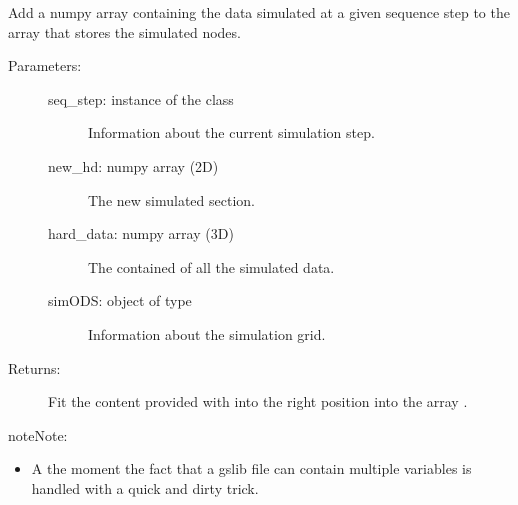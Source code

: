 \documentclass[letterpaper,10pt,english]{sphinxmanual}
\begin{document}
\begin{fulllineitems}
\label{\detokenize{appendices:s2Dcd.s2Dcd.add_hd}}
Add a numpy array containing the data simulated at a given
sequence step to the array that stores the simulated nodes.
\begin{description}
\item[{Parameters:}] \leavevmode\begin{description}
\item[{seq\_step: instance of the class {\hyperref[\detokenize{appendices:s2Dcd.s2Dcd.SeqStep}]{}}}] \leavevmode
Information about the current simulation step.

\item[{new\_hd: numpy array (2D)}] \leavevmode
The new simulated section.

\item[{hard\_data: numpy array (3D)}] \leavevmode
The contained of all the simulated data.

\item[{simODS:  object of type }] \leavevmode
Information about the simulation grid.

\end{description}

\item[{Returns:}] \leavevmode
Fit the content provided with  into the right position
into the array .

\end{description}

\begin{sphinxadmonition}{note}{Note:}\begin{itemize}
\item {} 
A the moment the fact that a gslib file can contain multiple 
variables is handled with a quick and dirty trick.

\end{itemize}
\end{sphinxadmonition}

\end{fulllineitems}

\end{document}
